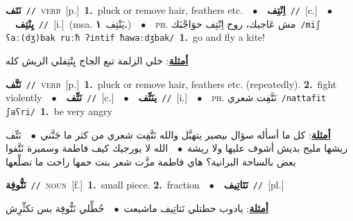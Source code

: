 \documentclass[10pt,a4paper,twoside]{article} %
\begin{document}
\begin{multicols}{2}
{\setlength\topsep{0pt}\textbf{\foreignlanguage{arabic}{نَتَف}}\ {\color{gray}\texttt{//}\color{black}}\ \textsc{verb}\ [p.]\ \textbf{1.}~pluck or remove hair, feathers etc.\ \ $\bullet$\ \ \setlength\topsep{0pt}\textbf{\foreignlanguage{arabic}{اِنْتِف}}\ {\color{gray}\texttt{//}\color{black}}\ [c.]\ \ $\bullet$\ \ \setlength\topsep{0pt}\textbf{\foreignlanguage{arabic}{يِنْتِف}}\ {\color{gray}\texttt{//}\color{black}}\ [i.]\ \color{gray}(msa. \foreignlanguage{arabic}{يَنْتِف}~\foreignlanguage{arabic}{\textbf{١.}})\color{black}\ \ $\bullet$\ \ \textsc{ph.} \color{gray} \foreignlanguage{arabic}{مش عَاجبك، روح اِنْتِف حوَاجْبَك}\color{black}\ {\color{gray}\texttt{/{\sffamily miʃ ʕaː(dʒ)bak ruːħ ʔintif ħawaːdʒbak}/}\color{black}}\ \textbf{1.}~go and fly a kite!\  \begin{flushright}\color{gray}\foreignlanguage{arabic}{\textbf{\underline{\foreignlanguage{arabic}{أمثلة}}}: خلي الزلمة تبع الجاج يِنْتِفلي الريش كله}\end{flushright}\color{black}} \vspace{2mm}

{\setlength\topsep{0pt}\textbf{\foreignlanguage{arabic}{نَتَّف}}\ {\color{gray}\texttt{//}\color{black}}\ \textsc{verb}\ [p.]\ \textbf{1.}~pluck or remove hair, feathers etc. (repeatedly).  \textbf{2.}~fight violently\ \ $\bullet$\ \ \setlength\topsep{0pt}\textbf{\foreignlanguage{arabic}{نَتِّف}}\ {\color{gray}\texttt{//}\color{black}}\ [c.]\ \ $\bullet$\ \ \setlength\topsep{0pt}\textbf{\foreignlanguage{arabic}{ينَتِّف}}\ {\color{gray}\texttt{//}\color{black}}\ [i.]\ \ $\bullet$\ \ \textsc{ph.} \color{gray} \foreignlanguage{arabic}{نَتَّفِت شعري}\color{black}\ {\color{gray}\texttt{/{\sffamily nattafit ʃaʕri}/}\color{black}}\ \textbf{1.}~be very angry\  \begin{flushright}\color{gray}\foreignlanguage{arabic}{\textbf{\underline{\foreignlanguage{arabic}{أمثلة}}}: كل ما أسأله سؤال بيصير يتهبَّل والله نَتَّفِت شعري من كثر ما جَنَّني\ $\bullet$\ \  نَتِّف ريشها مليح بديش أشوف عليها ولا ريشة\ $\bullet$\ \  الله لا يورجيك كيف فاطمة وسميرة نَتَّفوا بعض بالساحة البرانية؟ هاي فاطمة مزَّت شعر بنت حمها راحت ما تصلِّعها}\end{flushright}\color{black}} \vspace{2mm}

{\setlength\topsep{0pt}\textbf{\foreignlanguage{arabic}{نَتُّوفِة}}\ {\color{gray}\texttt{//}\color{black}}\ \textsc{noun}\ [f.]\ \textbf{1.}~small piece.  \textbf{2.}~fraction\ \ $\bullet$\ \ \setlength\topsep{0pt}\textbf{\foreignlanguage{arabic}{نَتَاتِيف}}\ {\color{gray}\texttt{//}\color{black}}\ [pl.]\  \begin{flushright}\color{gray}\foreignlanguage{arabic}{\textbf{\underline{\foreignlanguage{arabic}{أمثلة}}}: يادوب حطتلي نَتاتِيف ماشبعت\ $\bullet$\ \  حُطِّلي نَتُّوفِة بس تكثِّرِش}\end{flushright}\color{black}} \vspace{2mm}


\end{multicols}
\end{document}

